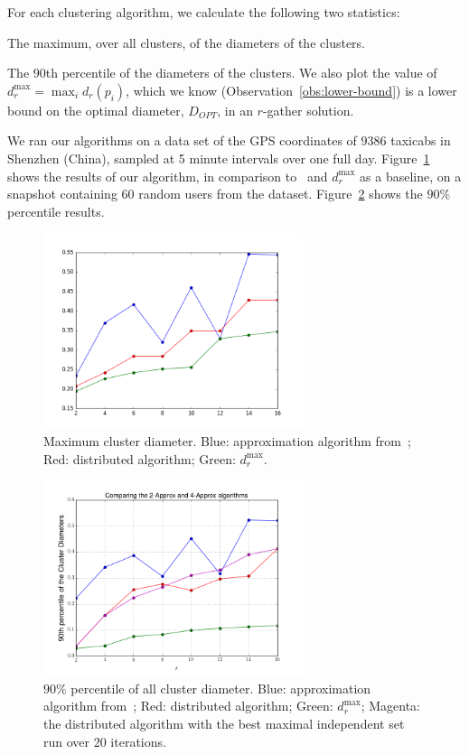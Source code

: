 For each clustering algorithm, we calculate the following two statistics:
\bitem
\item  The maximum, over all clusters, of the diameters of the clusters.
\item  The $90$th percentile of the diameters of the clusters.
\eitem
We also plot the value of $d_r^{\max}=\max_i d_r(p_i)$, which we know (Observation~\ref{obs:lower-bound}) is a lower bound on the optimal diameter, $D_{OPT}$, in an $r$-gather solution.

We ran our algorithms on a data set of the GPS coordinates of $9386$
taxicabs in Shenzhen (China), sampled at 5 minute intervals over one
full day.
Figure~\ref{fig:comparison} shows the results of our algorithm, in comparison
to~\cite{Aggarwal06achievinganonymity} and $d_{r}^{\max}$ as a baseline, on a snapshot containing $60$ random users from the dataset. Figure~\ref{fig:comparison-90} shows the $90\%$ percentile results.  

\begin{figure}[h]
\begin{center}
\includegraphics[width=3in]{figs/figure_1.png}
\caption{Maximum cluster diameter. Blue: approximation algorithm from~\cite{Aggarwal06achievinganonymity}; Red: distributed algorithm; Green: $d_{r}^{\max}$.}\label{fig:comparison}
\end{center}
\end{figure}


\begin{figure}[h]
\begin{center}
\includegraphics[width=3in]{figs/90thpercentile_60Cars.png}
\caption{$90\%$ percentile of all cluster diameter. Blue: approximation algorithm from~\cite{Aggarwal06achievinganonymity}; Red: distributed algorithm; Green: $d_{r}^{\max}$; Magenta: the distributed algorithm with the best maximal independent set run over $20$ iterations.}\label{fig:comparison-90}
\end{center}
\end{figure}

